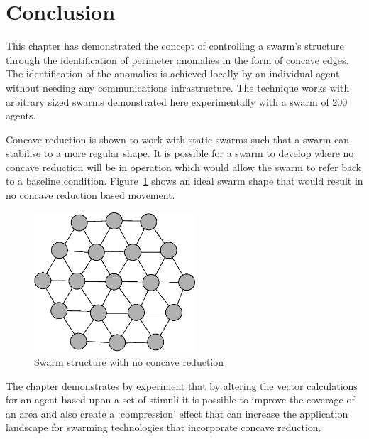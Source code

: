 \section{Conclusion}\label{voids:Conclusion}
This chapter has demonstrated the concept of controlling a swarm's structure through the identification of perimeter anomalies in the form of concave edges. The identification of the anomalies is achieved locally by an individual agent without needing any communications infrastructure. The technique works with arbitrary sized swarms demonstrated here experimentally with a swarm of 200 agents.

Concave reduction is shown to work with static swarms such that a swarm can stabilise to a more regular shape. It is possible for a swarm to develop where no concave reduction will be in operation which would allow the swarm to refer back to a baseline condition. Figure~\ref{voids:IdealSwarm} shows an ideal swarm shape that would result in no concave reduction based movement. 

\begin{figure}[H]
\begin{center}
\includegraphics[width=6cm]{CHAPTER-7/figures/IdealSwarm}
\end{center}
\caption{Swarm structure with no concave reduction\label{voids:IdealSwarm}}
\end{figure}

The chapter demonstrates by experiment that by altering the vector calculations for an agent based upon a set of stimuli it is possible to improve the coverage of an area and also create a `compression' effect that can increase the application landscape for swarming technologies that incorporate concave reduction.
